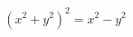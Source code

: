 \documentclass[preview]{standalone}
\begin{document}
\begin{align*}
(x^2 + y^2)^2 = x^2 - y^2
\end{align*}
\end{document}

